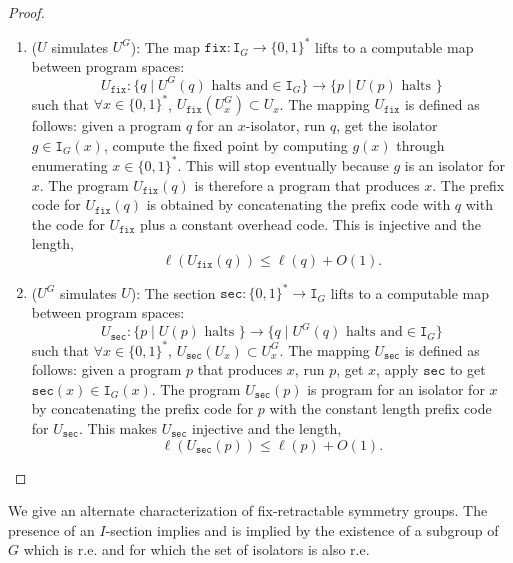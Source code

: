 \documentclass{article}
\newcommand{\bin}{\{0,1\}^*} %
\newcommand{\I}{\mathtt{I}}
\newcommand{\fix}{\mathtt{fix}}
\newcommand{\s}{\mathtt{sec}}
\begin{document}
\begin{proof}
    \begin{enumerate}
    \item ($U$ simulates $U^G$):
    The map $\fix: \I_G \to \bin$ lifts to a computable map between program spaces:
    \begin{equation}
        U_{\fix}: \{q \mid U^G(q) \text{ halts and} \in \I_G\} \to \{ p \mid U(p) \text{ halts }\}
    \end{equation}
    such that $\forall x \in \bin$, $U_{\fix}(U^G_x) \subset U_x$. The mapping $U_{\fix}$ is defined as follows: given a program $q$ for an $x$-isolator, run $q$, get the isolator $g \in \I_G(x)$, compute the fixed point by computing $g(x)$ through enumerating $x \in \bin$. This will stop eventually because $g$ is an isolator for $x$. The program $U_{\fix}(q)$ is therefore a program that produces $x$. The prefix code for $U_{\fix}(q)$ is obtained by concatenating the prefix code with $q$ with the code for $U_{\fix}$ plus a constant overhead code. This is injective and the length,
    \begin{equation}
        \ell(U_{\fix}(q)) \leq \ell(q) + O(1).
    \end{equation}

    \item ($U^G$ simulates $U$):
    The section $\s: \bin \to \I_G$ lifts to a computable map between program spaces:
    \begin{equation}
        U_{\s}: \{ p \mid U(p) \text{ halts }\} \to \{q \mid U^G(q) \text{ halts and} \in \I_G\}
    \end{equation}
    such that $\forall x \in \bin$, $U_{\s}(U_x) \subset U^G_x$. The mapping $U_{\s}$ is defined as follows: given a program $p$ that produces $x$, run $p$, get $x$, apply $\s$ to get $\s(x) \in \I_G(x)$. The program $U_{\s}(p)$ is program for an isolator for $x$ by concatenating the prefix code for $p$ with the constant length prefix code for $U_{\s}$. This makes $U_{\s}$ injective and the length,
    \begin{equation}
        \ell(U_{\s}(p)) \leq \ell(p) + O(1).
    \end{equation}

    \end{enumerate}
\end{proof}

We give an alternate characterization of fix-retractable symmetry groups. The presence of an $I$-section implies and is implied by the existence of a subgroup of $G$ which is r.e. and for which the set of isolators is also r.e.
\end{document}
